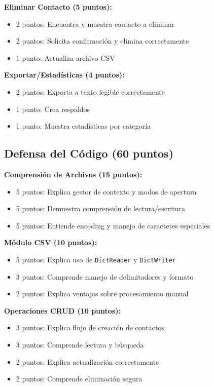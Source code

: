 \documentclass[11pt,letterpaper]{article}
\begin{document}
\textbf{Eliminar Contacto (5 puntos):}
\begin{itemize}
    \item 2 puntos: Encuentra y muestra contacto a eliminar
    \item 2 puntos: Solicita confirmación y elimina correctamente
    \item 1 punto: Actualiza archivo CSV
\end{itemize}

\textbf{Exportar/Estadísticas (4 puntos):}
\begin{itemize}
    \item 2 puntos: Exporta a texto legible correctamente
    \item 1 punto: Crea respaldos
    \item 1 punto: Muestra estadísticas por categoría
\end{itemize}

\subsection{Defensa del Código (60 puntos)}

\textbf{Comprensión de Archivos (15 puntos):}
\begin{itemize}
    \item 5 puntos: Explica gestor de contexto y modos de apertura
    \item 5 puntos: Demuestra comprensión de lectura/escritura
    \item 5 puntos: Entiende encoding y manejo de caracteres especiales
\end{itemize}

\textbf{Módulo CSV (10 puntos):}
\begin{itemize}
    \item 5 puntos: Explica uso de \texttt{DictReader} y \texttt{DictWriter}
    \item 3 puntos: Comprende manejo de delimitadores y formato
    \item 2 puntos: Explica ventajas sobre procesamiento manual
\end{itemize}

\textbf{Operaciones CRUD (10 puntos):}
\begin{itemize}
    \item 3 puntos: Explica flujo de creación de contactos
    \item 3 puntos: Comprende lectura y búsqueda
    \item 2 puntos: Explica actualización correctamente
    \item 2 puntos: Comprende eliminación segura
\end{itemize}
\end{document}
